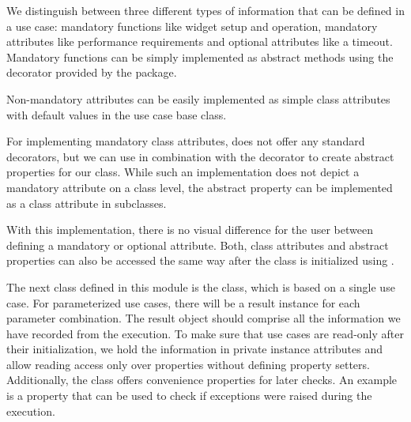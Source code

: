 

We distinguish between three different types of information that can be defined
in a use case: mandatory functions like widget setup and operation, mandatory
attributes like performance requirements and optional attributes like a timeout.
Mandatory functions can be simply implemented as abstract methods using the
 decorator provided by the
 package.



Non-mandatory attributes can be easily implemented as simple class attributes
with default values in the use case base class.



For implementing mandatory class attributes,  does not
offer any standard decorators, but we can use  in
combination with the  decorator to create
abstract properties for our class. While such an implementation does not
depict a mandatory attribute on a class level, the abstract property
can be implemented as a class attribute in subclasses.





With this implementation, there is no visual difference for the user between
defining a mandatory or optional attribute. Both, class attributes and abstract
properties can also be accessed the same way after the class is initialized
using .

The next class defined in this module is the 
class, which is based on a single use case. For parameterized use cases, there
will be a result instance for each parameter combination. The result object
should comprise all the information we have recorded from the execution. To make
sure that use cases are read-only after their initialization, we hold the
information in private instance attributes and allow reading access only over
properties without defining property setters. Additionally, the class offers
convenience properties for later checks.  An example is a
 property that can be used to check if exceptions
were raised during the execution.


